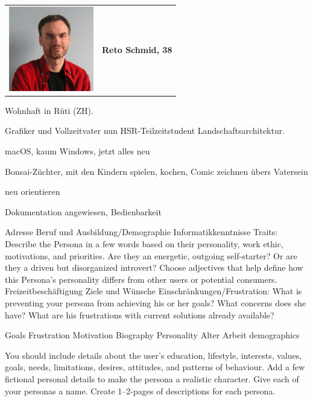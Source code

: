\documentclass[a4paper]{article}
\begin{document}
\begin{tabulary}{\linewidth}{m{10em}l}
	\includegraphics[width=10em]{../../img/userpersonaimages02.png} & \textbf{{\large Reto Schmid, 38}} \\
\end{tabulary}

\begin{description}[uclist]
	\item[Adresse] Wohnhaft in Rüti (ZH).
	\item[Ausbildung und Beruf] Grafiker und Vollzeitvater nun HSR-Teilzeitstudent Landschaftsarchitektur.
	\item[Informatikkenntnisse] macOS, kaum Windows, jetzt alles neu
	\item[Freizeitbeschäftigung] Bonsai-Züchter, mit den Kindern spielen, kochen, Comic zeichnen übers Vatersein
	\item[Persönlichkeit] 
	\item[Ziele und Wünsche] neu orientieren
	\item[Einschränkungen] Dokumentation angewiesen, Bedienbarkeit
	\item[Erwartungen an \emph{kitovu}] 
\end{description}


Adresse
Beruf und Ausbildung/Demographie
Informatikkenntnisse
Traits: Describe the Persona in a few words based on their personality, work ethic, motivations, and priorities. Are they an energetic, outgoing self-starter? Or are they a driven but disorganized introvert? Choose adjectives that help define how this Persona’s personality differs from other users or potential consumers.
Freizeitbeschäftigung
Ziele und Wünsche
Einschränkungen/Frustration: What is preventing your persona from achieving his or her goals? What concerns does she have? What are his frustrations with current solutions already available?




Goals
Frustration
Motivation
Biography
Personality
Alter
Arbeit
demographics

You should include details about the user’s education, lifestyle, interests, values, goals, needs, limitations, desires, attitudes, and patterns of behaviour.
Add a few fictional personal details to make the persona a realistic character.
Give each of your personas a name.
Create 1–2-pages of descriptions for each persona.
\end{document}
